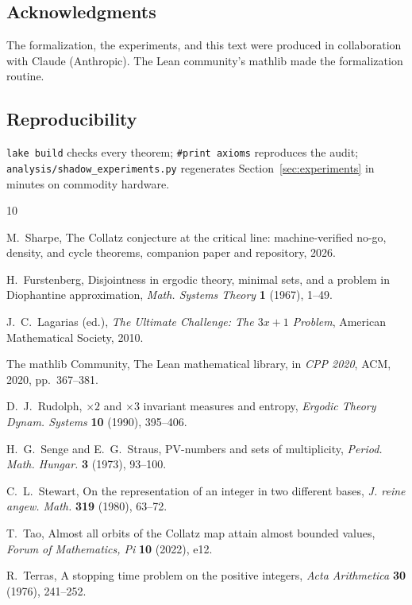 \documentclass[11pt]{article}
\newcommand{\code}[1]{\texttt{#1}}
\begin{document}
\subsection*{Acknowledgments}
The formalization, the experiments, and this text were produced in
collaboration with Claude (Anthropic). The Lean community's
\textsf{mathlib} made the formalization routine.

\subsection*{Reproducibility}
\code{lake build} checks every theorem; \code{\#print axioms}
reproduces the audit; \code{analysis/shadow\_experiments.py}
regenerates Section~\ref{sec:experiments} in minutes on commodity
hardware.

\begin{thebibliography}{10}

 M.~Sharpe, The Collatz conjecture at the critical
line: machine-verified no-go, density, and cycle theorems, companion
paper and repository, 2026.

 H.~Furstenberg, Disjointness in ergodic theory,
minimal sets, and a problem in Diophantine approximation,
\emph{Math. Systems Theory} \textbf{1} (1967), 1--49.

 J.~C.~Lagarias (ed.), \emph{The Ultimate
Challenge: The $3x+1$ Problem}, American Mathematical Society, 2010.

 The mathlib Community, The Lean mathematical library,
in \emph{CPP 2020}, ACM, 2020, pp.~367--381.

 D.~J.~Rudolph, $\times 2$ and $\times 3$ invariant
measures and entropy, \emph{Ergodic Theory Dynam. Systems}
\textbf{10} (1990), 395--406.

 H.~G.~Senge and E.~G.~Straus, PV-numbers and
sets of multiplicity, \emph{Period. Math. Hungar.} \textbf{3} (1973),
93--100.

 C.~L.~Stewart, On the representation of an integer
in two different bases, \emph{J. reine angew. Math.} \textbf{319}
(1980), 63--72.

 T.~Tao, Almost all orbits of the Collatz map attain
almost bounded values, \emph{Forum of Mathematics, Pi} \textbf{10}
(2022), e12.

 R.~Terras, A stopping time problem on the positive
integers, \emph{Acta Arithmetica} \textbf{30} (1976), 241--252.

\end{thebibliography}
\end{document}
